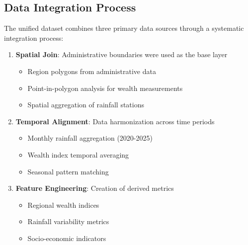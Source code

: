 \documentclass[12pt,a4paper]{article}
\begin{document}
\subsection{Data Integration Process}
The unified dataset combines three primary data sources through a systematic integration process:
\begin{enumerate}
    \item \textbf{Spatial Join}: Administrative boundaries were used as the base layer
    \begin{itemize}
        \item Region polygons from administrative data
        \item Point-in-polygon analysis for wealth measurements
        \item Spatial aggregation of rainfall stations
    \end{itemize}
    
    \item \textbf{Temporal Alignment}: Data harmonization across time periods
    \begin{itemize}
        \item Monthly rainfall aggregation (2020-2025)
        \item Wealth index temporal averaging
        \item Seasonal pattern matching
    \end{itemize}
    
    \item \textbf{Feature Engineering}: Creation of derived metrics
    \begin{itemize}
        \item Regional wealth indices
        \item Rainfall variability metrics
        \item Socio-economic indicators
    \end{itemize}
\end{enumerate}
\end{document}
